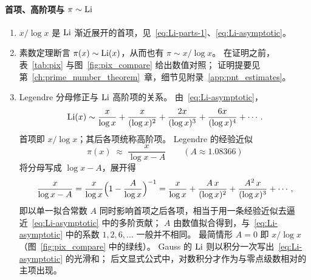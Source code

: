 \paragraph{首项、高阶项与 $\pi\sim\operatorname{Li}$}
\begin{enumerate}
  \item $x/\log x$ 是 $\operatorname{Li}$ 渐近展开的首项，见~\eqref{eq:Li-parts-1}、\eqref{eq:Li-asymptotic}。
  \item 素数定理断言 $\pi(x)\sim\operatorname{Li}(x)$，从而也有 $\pi\sim x/\log x$。
    在证明之前，表~\ref{tab:pix} 与图~\ref{fig:pix_compare} 给出数值对照；
    证明提要见第~\ref{ch:prime_number_theorem}~章，细节见附录~\ref{app:pnt_estimates}。
  \item Legendre 分母修正与 $\operatorname{Li}$ 高阶项的关系。
    由~\eqref{eq:Li-asymptotic}，
    \[
      \operatorname{Li}(x)
      \sim
      \frac{x}{\log x}
      +\frac{x}{(\log x)^{2}}
      +\frac{2x}{(\log x)^{3}}
      +\frac{6x}{(\log x)^{4}}
      +\cdots.
    \]
    首项即 $x/\log x$；其后各项统称高阶项。
    Legendre 的经验近似
    \[
      \pi(x)\;\approx\;\frac{x}{\log x-A}
      \qquad (A\approx 1.08366)
    \]
    将分母写成 $\log x-A$，展开得
    \begin{equation}
      \frac{x}{\log x-A}
      =\frac{x}{\log x}\Bigl(1-\frac{A}{\log x}\Bigr)^{-1}
      =\frac{x}{\log x}
      +\frac{A\,x}{(\log x)^{2}}
      +\frac{A^{2}\,x}{(\log x)^{3}}
      +\cdots,
      \label{eq:legendre-denom-expand}
    \end{equation}
    即以单一拟合常数 $A$ 同时影响首项之后各项，相当于用一条经验近似去逼近~\eqref{eq:Li-asymptotic} 中的多阶贡献；
    $A$ 由数值拟合得到，与~\eqref{eq:Li-asymptotic} 中的系数 $1,2,6,\ldots$ 一般并不相同。
    最简情形 $A=0$ 即 $x/\log x$（图~\ref{fig:pix_compare} 中的绿线）。
    Gauss 的 $\operatorname{Li}$ 则以积分一次写出~\eqref{eq:Li-asymptotic} 的光滑和；
    后文显式公式中，对数积分才作为与零点级数相对的主项出现。
\end{enumerate}

